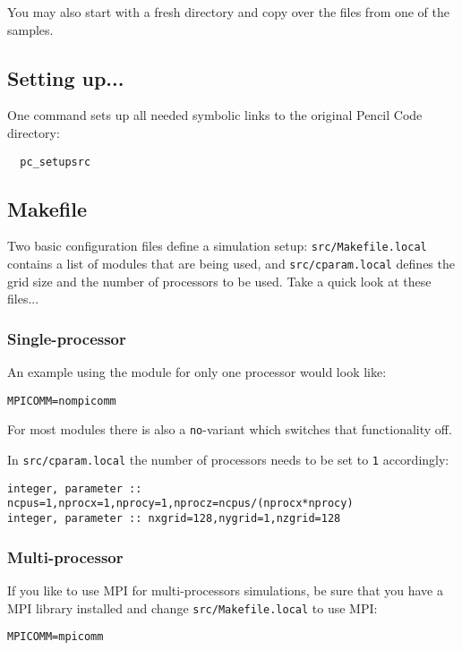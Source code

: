 \documentclass[a4paper,12pt]{article}
\begin{document}
You may also start with a fresh directory and copy over the files from one of the samples.

\subsection{Setting up...}

One command sets up all needed symbolic links to the original Pencil Code directory:

\begin{verbatim}
  pc_setupsrc
\end{verbatim}

\subsection{Makefile}

Two basic configuration files define a simulation setup: \verb|src/Makefile.local| contains a list of modules that are being used, and \verb|src/cparam.local| defines the grid size and the number of processors to be used.
Take a quick look at these files...


\subsubsection{Single-processor}
An example using the module for only one processor would look like:
\begin{verbatim}
MPICOMM=nompicomm
\end{verbatim}

For most modules there is also a \verb|no|-variant which switches that functionality off.

In \verb|src/cparam.local| the number of processors needs to be set to \verb|1| accordingly:
\begin{verbatim}
integer, parameter :: ncpus=1,nprocx=1,nprocy=1,nprocz=ncpus/(nprocx*nprocy)
integer, parameter :: nxgrid=128,nygrid=1,nzgrid=128
\end{verbatim}

\subsubsection{Multi-processor}
If you like to use MPI for multi-processors simulations, be sure that you have a MPI library installed and change \verb|src/Makefile.local| to use MPI:
\begin{verbatim}
MPICOMM=mpicomm
\end{verbatim}
\end{document}
